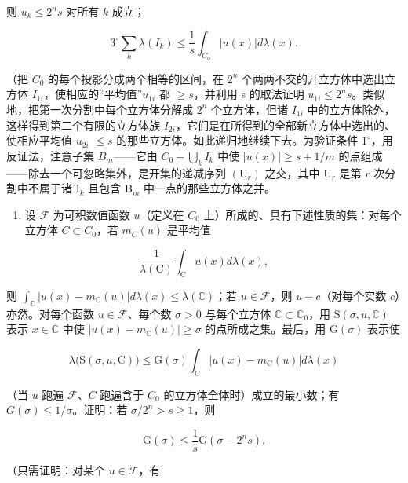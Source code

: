 则 \(u_{k} \leqslant 2^{n}s\) 对所有 \(k\) 成立；

\[
3 ^ {\circ} \sum_ {k} \lambda (I _ {k}) \leqslant \frac {1}{s} \int_ {C _ {0}} | u (x) | d \lambda (x).
\]

（把 \(C_{0}\) 的每个投影分成两个相等的区间，在 \(2^{n}\) 个两两不交的开立方体中选出立方体 \(I_{1i}\)，使相应的“平均值”\(u_{1i}\) 都 \(\geqslant s\)，并利用 s 的取法证明 \(u_{1i} \leqslant 2^{n}s\)。类似地，把第一次分割中每个立方体分解成 \(2^{n}\) 个立方体，但诸 \(I_{1i}\) 中的立方体除外，这样得到第二个有限的立方体族 \(I_{2i}\)，它们是在所得到的全部新立方体中选出的、使相应平均值 \(u_{2i}\) \(\leqslant s\) 的那些立方体。如此递归地继续下去。为验证条件 \(1^{\circ}\)，用反证法，注意子集 \(B_{m}\)——它由 \(C_{0} - \bigcup_{k} I_{k}\) 中使 \(|u(x)| \geqslant s + 1/m\) 的点组成——除去一个可忽略集外，是开集的递减序列 \((\mathrm{U}_r)\) 之交，其中 \(\mathrm{U}_r\) 是第 \(r\) 次分割中不属于诸 \(\mathrm{I}_k\) 且包含 \(\mathrm{B}_m\) 中一点的那些立方体之并。

\begin{enumerate}
\def\labelenumi{\alph{enumi})}
\setcounter{enumi}{1}
\tightlist
\item
  设 \(\mathcal{F}\) 为可积数值函数 \(u\)（定义在 \(C_0\) 上）所成的、具有下述性质的集：对每个立方体 \(C \subset C_0\)，若 \(m_C(u)\) 是平均值
\end{enumerate}

\[
\frac {1}{\lambda (\mathrm{C})} \int_ {\mathrm{C}} u (x) d \lambda (x),
\]

则 \(\int_{\mathbb{C}} |u(x) - m_{\mathbb{C}}(u)| d\lambda(x) \leqslant \lambda(\mathbb{C})\)；若 \(u \in \mathcal{F}\)，则 \(u - c\)（对每个实数 \(c\)）亦然。对每个函数 \(u \in \mathcal{F}\)、每个数 \(\sigma > 0\) 与每个立方体 \(\mathbb{C} \subset \mathbb{C}_0\)，用 \(\mathrm{S}(\sigma, u, \mathbb{C})\) 表示 \(x \in \mathbb{C}\) 中使 \(|u(x) - m_{\mathbb{C}}(u)| \geqslant \sigma\) 的点所成之集。最后，用 \(\mathrm{G}(\sigma)\) 表示使

\[
\lambda \bigl (\mathrm{S} (\sigma , u, \mathrm{C}) \bigr) \leqslant \mathrm{G} (\sigma) \int_ {\mathrm{C}} | u (x) - m _ {\mathrm{C}} (u) | d \lambda (x)
\]

（当 \(u\) 跑遍 \(\mathcal{F}\)、\(C\) 跑遍含于 \(C_0\) 的立方体全体时）成立的最小数；有 \(G(\sigma) \leqslant 1 / \sigma\)。证明：若 \(\sigma / 2^n > s \geqslant 1\)，则

\[
\mathrm{G} (\sigma) \leqslant \frac {1}{s} \mathrm{G} (\sigma - 2 ^ {n} s).
\]

（只需证明：对某个 \(u \in \mathcal{F}\)，有

